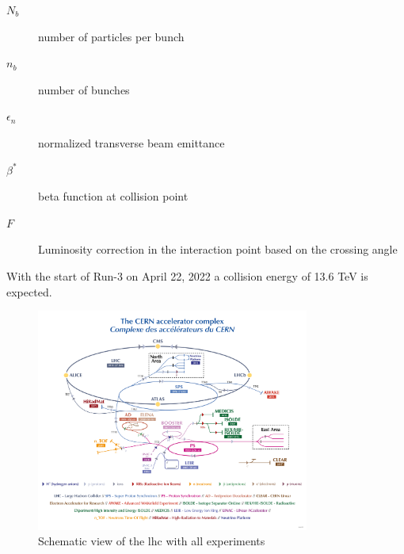\documentclass[../Bachelorarbeit.tex]{subfiles}
\begin{document}
\begin{description}
    \item[$N_{b}$] number of particles per bunch
    \item[$n_{b}$]  number of bunches
    \item[$\epsilon_{n}$]  normalized transverse beam emittance
    \item[$\beta^{*}$] beta function at collision point
    \item[$F$] Luminosity correction in the interaction point based on the crossing angle
\end{description}
With the start of Run-3 on April 22, 2022 a collision energy of 13.6 TeV is expected.
\begin{figure}
    \centering
    \includegraphics[width=0.8\textwidth]{images/CCC-v2022.jpg}
    \caption{Schematic view of the \acrshort{lhc} with all experiments \cite{CERN.01.05.2022}}
    \label{fig:LHC_schematic}
\end{figure}
\end{document}
